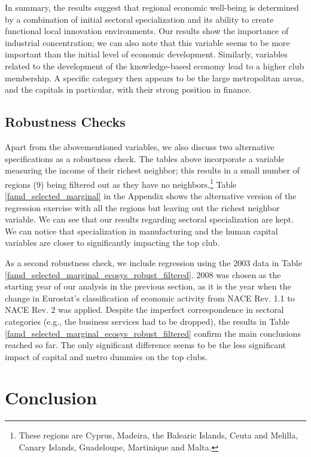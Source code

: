 \documentclass[11pt]{article}
\begin{document}
In summary, the results suggest that regional economic well-being is determined by a combination of initial sectoral specialization and its ability to create functional local innovation environments. Our results show the importance of industrial concentration; we can also note that this variable seems to be more important than the initial level of economic development. Similarly, variables related to the development of the knowledge-based economy lead to a higher club membership. A specific category then appears to be the large metropolitan areas, and the capitals in particular, with their strong position in finance.

\subsection{Robustness Checks}
Apart from the abovementioned variables, we also discuss two alternative specifications as a robustness check. The tables above incorporate a variable measuring the income of their richest neighbor; this results in a small number of regions (9) being filtered out as they have no neighbors.\footnote{These regions are Cyprus, Madeira, the Balearic Islands, Ceuta and Melilla, Canary Islands, Guadeloupe, Martinique and Malta.} Table \ref{famd_selected_marginal} in the Appendix shows the alternative version of the regression exercise with all the regions but leaving out the richest neighbor variable. We can see that our results regarding sectoral specialization are kept. We can notice that specialization in manufacturing and the human capital variables are closer to significantly impacting the top club.

As a second robustness check, we include regression using the 2003 data in Table \ref{famd_selected_marginal_ecosys_robust_filtered}.  2008 was chosen as the starting year of our analysis in the previous section, as it is the year when the change in Eurostat's classification of economic activity from NACE Rev. 1.1 to NACE Rev. 2 was applied. Despite the imperfect correspondence in sectoral categories (e.g., the business services had to be dropped), the results in Table \ref{famd_selected_marginal_ecosys_robust_filtered} confirm the main conclusions reached so far. The only significant difference seems to be the less significant impact of capital and metro dummies on the top clubs.

\section{Conclusion}
\end{document}
